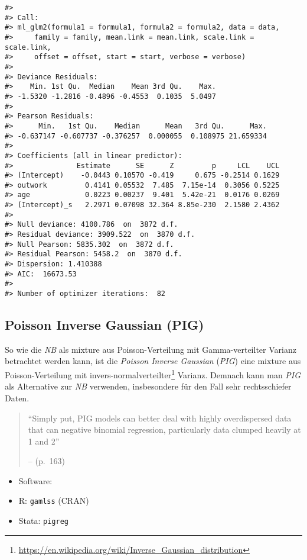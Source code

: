 \documentclass[ngerman,a4paper,]{scrartcl}
\renewcommand{\href}[2]{#2\footnote{\url{#1}}}
\providecommand{\tightlist}{%
  \setlength{\itemsep}{0pt}\setlength{\parskip}{0pt}}
\let\rmarkdownfootnote\footnote%
\def\footnote{\protect\rmarkdownfootnote}
\theoremstyle{definition}
\theoremstyle{definition}
\theoremstyle{definition}
\theoremstyle{remark}
\begin{document}
\begin{verbatim}
#> 
#> Call:
#> ml_glm2(formula1 = formula1, formula2 = formula2, data = data, 
#>     family = family, mean.link = mean.link, scale.link = scale.link, 
#>     offset = offset, start = start, verbose = verbose)
#> 
#> Deviance Residuals:
#>    Min. 1st Qu.  Median    Mean 3rd Qu.    Max. 
#> -1.5320 -1.2816 -0.4896 -0.4553  0.1035  5.0497 
#> 
#> Pearson Residuals:
#>      Min.   1st Qu.    Median      Mean   3rd Qu.      Max. 
#> -0.637147 -0.607737 -0.376257  0.000055  0.108975 21.659334 
#> 
#> Coefficients (all in linear predictor):
#>               Estimate      SE      Z         p     LCL    UCL
#> (Intercept)    -0.0443 0.10570 -0.419     0.675 -0.2514 0.1629
#> outwork         0.4141 0.05532  7.485  7.15e-14  0.3056 0.5225
#> age             0.0223 0.00237  9.401  5.42e-21  0.0176 0.0269
#> (Intercept)_s   2.2971 0.07098 32.364 8.85e-230  2.1580 2.4362
#> 
#> Null deviance: 4100.786  on  3872 d.f.
#> Residual deviance: 3909.522  on  3870 d.f.
#> Null Pearson: 5835.302  on  3872 d.f.
#> Residual Pearson: 5458.2  on  3870 d.f.
#> Dispersion: 1.410388
#> AIC:  16673.53
#> 
#> Number of optimizer iterations:  82
\end{verbatim}

\hypertarget{mod-pig}{%
\subsection{Poisson Inverse Gaussian (PIG)}\label{mod-pig}}

So wie die \emph{NB} als mixture aus Poisson-Verteilung mit Gamma-verteilter Varianz betrachtet werden kann, ist die \emph{Poisson Inverse Gaussian} (\emph{PIG}) eine mixture aus Poisson-Verteilung mit \href{https://en.wikipedia.org/wiki/Inverse_Gaussian_distribution}{invers-normalverteilter} Varianz. Demnach kann man \emph{PIG} als Alternative zur \emph{NB} verwenden, insbesondere für den Fall sehr rechtsschiefer Daten.

\begin{quote}
\enquote{Simply put, PIG models can better deal with highly overdispersed data that can negative binomial regression, particularly data clumped heavily at 1 and 2}

-- \citet{hilbeModelingCountData2014} (p.~163)
\end{quote}

\begin{itemize}
\tightlist
\item
  Software:
\item
  R: \texttt{gamlss} (CRAN)
\item
  Stata: \texttt{pigreg}
\end{itemize}
\end{document}
